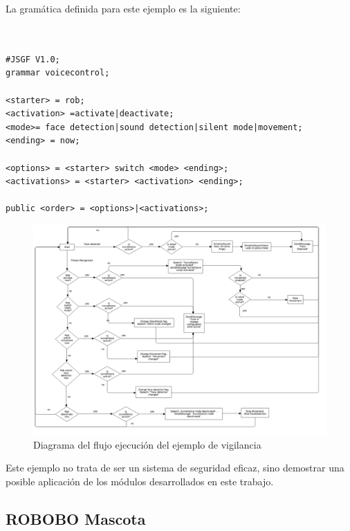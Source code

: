 La gramática definida para este ejemplo es la siguiente:

\begin{verbatim}


#JSGF V1.0;
grammar voicecontrol;

<starter> = rob;
<activation> =activate|deactivate;
<mode>= face detection|sound detection|silent mode|movement;
<ending> = now;

<options> = <starter> switch <mode> <ending>;
<activations> = <starter> <activation> <ending>;

public <order> = <options>|<activations>;

\end{verbatim}

\begin{figure}
	\centering
	\includegraphics[width=1.1\linewidth]{imagenes/vigilante_diagram.png}
	\caption{Diagrama del flujo  ejecución del ejemplo de vigilancia}
	\label{fig:vigilante-diagram}
\end{figure} 



Este ejemplo no trata de ser un sistema de seguridad eficaz, sino demostrar una posible aplicación de los módulos desarrollados en este trabajo.

\subsection{ROBOBO Mascota}
\label{subsec:robobo-mascota}



